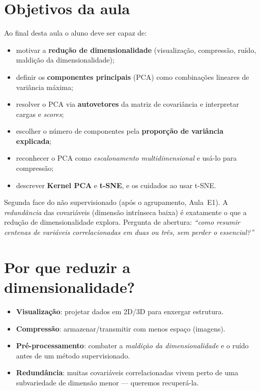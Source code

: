 \documentclass[11pt,a4paper]{article}
\begin{document}

\section*{Objetivos da aula}
Ao final desta aula o aluno deve ser capaz de:
\begin{itemize}[leftmargin=1.4cm]
  \item motivar a \textbf{redução de dimensionalidade} (visualização, compressão,
        ruído, maldição da dimensionalidade);
  \item definir os \textbf{componentes principais} (PCA) como combinações lineares
        de variância máxima;
  \item resolver o PCA via \textbf{autovetores} da matriz de covariância e
        interpretar cargas e \emph{scores};
  \item escolher o número de componentes pela \textbf{proporção de variância
        explicada};
  \item reconhecer o PCA como \emph{escalonamento multidimensional} e usá-lo para
        compressão;
  \item descrever \textbf{Kernel PCA} e \textbf{t-SNE}, e os cuidados ao usar t-SNE.
\end{itemize}

\begin{emsala}
Segunda face do não supervisionado (após o agrupamento, Aula~E1). A
\emph{redundância} das covariáveis (dimensão intrínseca baixa) é
exatamente o que a redução de dimensionalidade explora. Pergunta de abertura:
\emph{``como resumir centenas de variáveis correlacionadas em duas ou três, sem
perder o essencial?''}
\end{emsala}

\section{Por que reduzir a dimensionalidade?}
\begin{itemize}[leftmargin=1.4cm,nosep]
  \item \textbf{Visualização}: projetar dados em 2D/3D para enxergar estrutura.
  \item \textbf{Compressão}: armazenar/transmitir com menos espaço (imagens).
  \item \textbf{Pré-processamento}: combater a \emph{maldição da dimensionalidade}
        e o ruído antes de um método supervisionado.
  \item \textbf{Redundância}: muitas covariáveis correlacionadas vivem perto de uma
        subvariedade de dimensão menor --- queremos recuperá-la.
\end{itemize}
\end{document}
